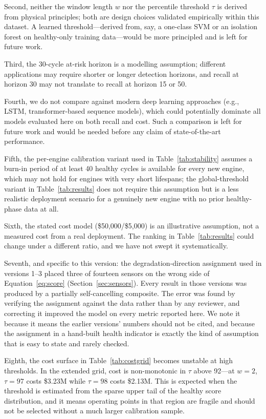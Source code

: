\documentclass[10pt,twocolumn]{article}
\begin{document}
Second, neither the window length $w$ nor the percentile threshold $\tau$ is derived
from physical principles; both are design choices validated empirically within this
dataset.
A learned threshold---derived from, say, a one-class SVM or an isolation forest on
healthy-only training data---would be more principled and is left for future work.

Third, the 30-cycle at-risk horizon is a modelling assumption; different applications
may require shorter or longer detection horizons, and recall at horizon 30 may not
translate to recall at horizon 15 or 50.

Fourth, we do not compare against modern deep learning approaches (e.g., LSTM,
transformer-based sequence models), which could potentially dominate all models
evaluated here on both recall and cost. Such a comparison is left for future work
and would be needed before any claim of state-of-the-art performance.

Fifth, the per-engine calibration variant used in Table~\ref{tab:stability} assumes a
burn-in period of at least 40 healthy cycles is available for every new engine, which
may not hold for engines with very short lifespans; the global-threshold variant in
Table~\ref{tab:results} does not require this assumption but is a less realistic
deployment scenario for a genuinely new engine with no prior healthy-phase data at
all.

Sixth, the stated cost model (\$50,000/\$5,000) is an illustrative assumption, not a
measured cost from a real deployment. The ranking in Table~\ref{tab:results} could
change under a different ratio, and we have not swept it systematically.

Seventh, and specific to this version: the degradation-direction assignment used in
versions 1--3 placed three of fourteen sensors on the wrong side of
Equation~\ref{eq:score} (Section~\ref{sec:sensors}). Every result in those versions was
produced by a partially self-cancelling composite. The error was found by verifying the
assignment against the data rather than by any reviewer, and correcting it improved the
model on every metric reported here. We note it because it means the earlier versions'
numbers should not be cited, and because the assignment in a hand-built health indicator
is exactly the kind of assumption that is easy to state and rarely checked.

Eighth, the cost surface in Table~\ref{tab:costgrid} becomes unstable at high
thresholds. In the extended grid, cost is non-monotonic in $\tau$ above 92---at $w=2$,
$\tau=97$ costs \$3.23M while $\tau=98$ costs \$2.13M. This is expected when the
threshold is estimated from the sparse upper tail of the healthy score distribution, and
it means operating points in that region are fragile and should not be selected without
a much larger calibration sample.
\end{document}
